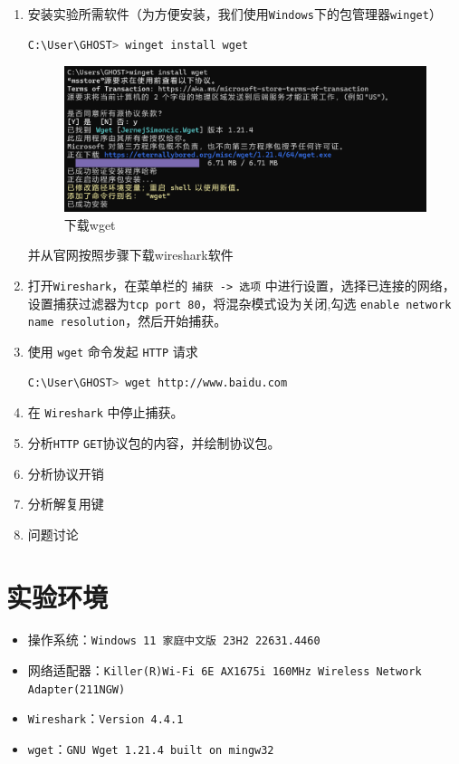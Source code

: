 \documentclass{article}
\begin{document}
	\begin{enumerate}[noitemsep, label={{\arabic*})}]
		\item 安装实验所需软件（为方便安装，我们使用\texttt{Windows}下的包管理器\texttt{winget}）
		
		\begin{lstlisting}[language=bash]
        C:\User\GHOST> winget install wget
		\end{lstlisting}
		
		\begin{figure}[H]
			\centering
			\includegraphics[width=12cm]{images/1.下载wget.png}
			\caption{下载wget}
		\end{figure}
		
		并从官网按照步骤下载wireshark软件
		
		\item 打开\texttt{Wireshark}，在菜单栏的 \texttt{捕获 -> 选项} 中进行设置，选择已连接的网络，设置捕获过滤器为\texttt{tcp port 80}，将混杂模式设为关闭,勾选 \texttt{enable network  name resolution}，然后开始捕获。
		\item 使用 \texttt{wget} 命令发起 \texttt{HTTP} 请求
		\begin{lstlisting}[language=bash]
        C:\User\GHOST> wget http://www.baidu.com
		\end{lstlisting}
		\item 在 \texttt{Wireshark} 中停止捕获。
		\item 分析\texttt{HTTP} \texttt{GET}协议包的内容，并绘制协议包。
		\item 分析协议开销
		\item 分析解复用键
		\item 问题讨论
	\end{enumerate}
	
	\section{实验环境}
	
	\begin{itemize}[noitemsep]
		\item 操作系统：\texttt{Windows 11 家庭中文版 23H2 22631.4460}
		\item 网络适配器：\texttt{Killer(R)Wi-Fi 6E AX1675i 160MHz Wireless Network Adapter(211NGW)}
		\item \texttt{Wireshark}：\texttt{Version 4.4.1}
		\item \texttt{wget}：\texttt{GNU Wget 1.21.4 built on mingw32}
	\end{itemize}
	
\end{document}
